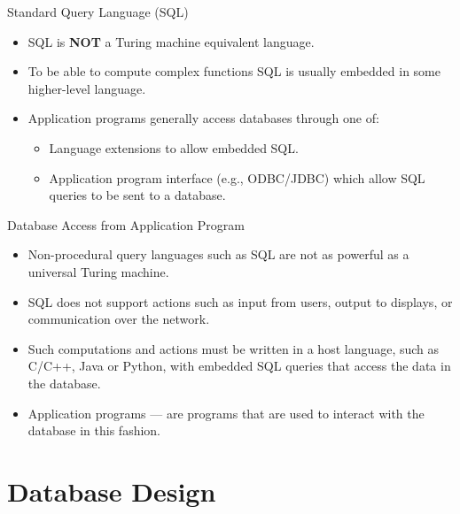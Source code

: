 \documentclass{beamer}
\begin{document}
\begin{frame}{Standard Query Language (SQL)}
    \begin{itemize}
        \item SQL is \textbf{NOT} a Turing machine equivalent language.
        \item To be able to compute complex functions SQL is usually embedded in some higher-level language.
        \item Application programs generally access databases through one of:
        \begin{itemize}
            \item Language extensions to allow embedded SQL.
            \item Application program interface (e.g., ODBC/JDBC) which allow SQL queries to be sent to a database.
        \end{itemize}
    \end{itemize}
\end{frame}

\begin{frame}{Database Access from Application Program}
    \begin{itemize}
        \item Non-procedural query languages such as SQL are not as powerful as a universal Turing machine.    
        \item SQL does not support actions such as input from users, output to displays, or communication over the network.  
        \item Such computations and actions must be written in a host language, such as C/C++, Java or Python, with embedded SQL queries that access the data in the database.
        \item Application programs --- are programs that are used to interact with the database in this fashion.  
    \end{itemize}
\end{frame}

\section{Database Design}
\end{document}
